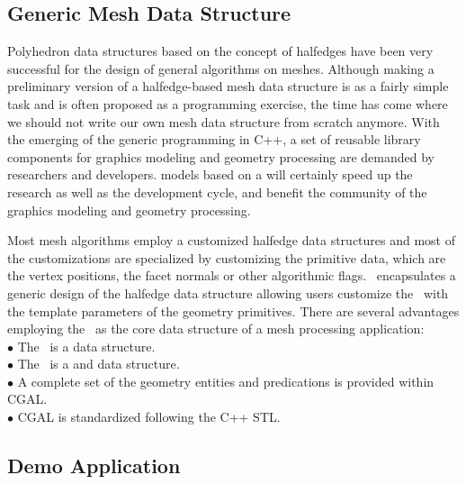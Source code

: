 \documentclass[letter,twocolumn]{article}
\begin{document}
\subsection*{Generic Mesh Data Structure}

Polyhedron data structures based on the concept of halfedges have been
very successful for the design of general algorithms on meshes.
Although making a preliminary version of a halfedge-based mesh data
structure is as a fairly simple task and is often proposed as a
programming exercise, the time has come where we should not write our
own mesh data structure from scratch anymore. With the emerging of the
generic programming in C++, a set of reusable library components for
graphics modeling and geometry processing are demanded by researchers
and developers.  models based on a
will certainly speed up the research as well as the development cycle,
and benefit the community of the graphics modeling and geometry
processing.

Most mesh algorithms employ a customized halfedge data structures
and most of the customizations are specialized by customizing the
primitive data, which are the vertex positions, the facet normals or
other algorithmic flags. \cgalpoly\ encapsulates a generic design of
the halfedge data structure allowing users customize the \poly\ with
the template parameters of the geometry primitives. There are several
advantages employing the \poly\ as the core data structure of a
mesh processing application: \\

\indent $\bullet$ The \poly\ is a  data structure.\\
\indent $\bullet$ The \poly\ is a  and  
data structure.\\
\indent $\bullet$ A complete set of the geometry entities and predications 
is provided within CGAL.\\
\indent $\bullet$ CGAL is standardized following the C++ STL.

\subsection*{Demo Application}
\end{document}
